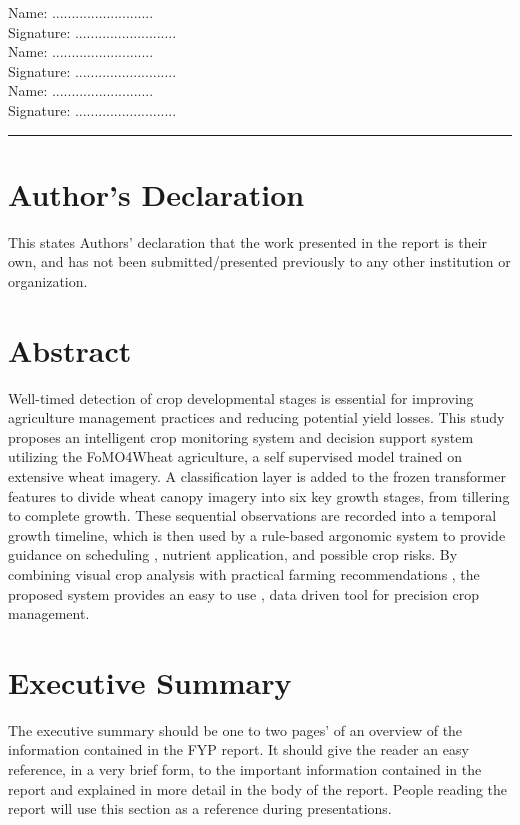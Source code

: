 \documentclass{FastFyp}
\begin{document}
\begin{flushright}
Name: ..........................
\\[3ex]
Signature: ..........................
\\[6ex]
Name: ..........................
\\[3ex]
Signature: ..........................
\\[6ex]
Name: ..........................
\\[3ex]
Signature: ..........................

\end{flushright} 

\vspace{5 cm} %
 
\hrule %

\section*{Author's Declaration}
This states Authors’ declaration that the work presented in the report is their own, and has not been submitted/presented previously to any other institution or organization.
\pagebreak
\section*{Abstract}
Well-timed detection of crop developmental stages is essential for improving agriculture management practices and reducing potential yield losses. This study proposes an intelligent crop monitoring system and decision support system utilizing the FoMO4Wheat agriculture, a self supervised model trained on extensive wheat imagery. A classification layer is added to the frozen transformer features  to divide wheat canopy imagery into six key growth stages, from tillering to complete growth. These sequential observations are recorded into a temporal growth timeline, which is then used by a rule-based argonomic system to provide guidance on scheduling , nutrient application, and possible crop risks. By combining visual crop analysis with practical farming recommendations , the proposed system provides an easy to use , data driven tool for precision crop management. 
\pagebreak 

\section*{Executive Summary}
The executive summary should be one to two pages’ of an overview of the information contained in the FYP report.  It should give the reader an easy reference, in a very brief form, to the important information contained in the report and explained in more detail in the body of the report. People reading the report will use this section as a reference during presentations. 
\pagebreak
\end{document}
